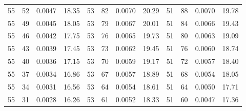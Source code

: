 \begin{tabular}{llll|llll|llll}
55 & 52 & 0.0047 & 18.35 & 53 & 82 & 0.0070 & 20.29 & 51 & 88 & 0.0070 & 19.78\\
55 & 49 & 0.0045 & 18.05 & 53 & 79 & 0.0067 & 20.01 & 51 & 84 & 0.0066 & 19.43\\
55 & 46 & 0.0042 & 17.75 & 53 & 76 & 0.0065 & 19.73 & 51 & 80 & 0.0063 & 19.09\\
55 & 43 & 0.0039 & 17.45 & 53 & 73 & 0.0062 & 19.45 & 51 & 76 & 0.0060 & 18.74\\
55 & 40 & 0.0036 & 17.15 & 53 & 70 & 0.0059 & 19.17 & 51 & 72 & 0.0057 & 18.40\\
55 & 37 & 0.0034 & 16.86 & 53 & 67 & 0.0057 & 18.89 & 51 & 68 & 0.0054 & 18.05\\
55 & 34 & 0.0031 & 16.56 & 53 & 64 & 0.0054 & 18.61 & 51 & 64 & 0.0050 & 17.71\\
55 & 31 & 0.0028 & 16.26 & 53 & 61 & 0.0052 & 18.33 & 51 & 60 & 0.0047 & 17.36\\
\bottomrule
\end{tabular}
\newpage

